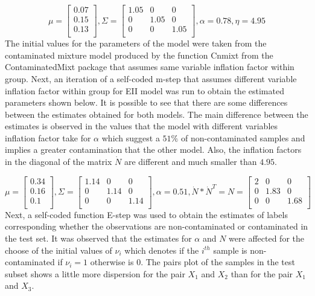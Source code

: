 \documentclass[
]{article}
\begin{document}
\[
\mu = \begin{bmatrix}0.07 \\0.15 \\0.13 \\\end{bmatrix} , \Sigma = \begin{bmatrix}1.05&0&0 \\0&1.05&0 \\0&0&1.05 \\\end{bmatrix}, \alpha = 0.78 , \eta = 4.95
\] The initial values for the parameters of the model were taken from
the contaminated mixture model produced by the function Cnmixt from the
ContaminatedMixt package that assumes same variable inflation factor
within group. Next, an iteration of a self-coded m-step that assumes
different variable inflation factor within group for EII model was run
to obtain the estimated parameters shown below. It is possible to see
that there are some differences between the estimates obtained for both
models. The main difference between the estimates is observed in the
values that the model with different variables inflation factor take for
\(\alpha\) which suggest a \(51\%\) of non-contaminated samples and
implies a greater contamination that the other model. Also, the
inflation factors in the diagonal of the matrix \(\dot{N}\) are
different and much smaller than \(4.95\).

\[
\mu = \begin{bmatrix}0.34 \\0.16 \\0.1 \\\end{bmatrix} , \Sigma = \begin{bmatrix}1.14&0&0 \\0&1.14&0 \\0&0&1.14 \\\end{bmatrix} , \alpha = 0.51, \dot{N} * \dot{N}^{T} = N = \begin{bmatrix}2&0&0 \\0&1.83&0 \\0&0&1.68 \\\end{bmatrix}
\] Next, a self-coded function E-step was used to obtain the estimates
of labels corresponding whether the observations are non-contaminated or
contaminated in the test set. It was observed that the estimates for
\(\alpha\) and \(N\) were affected for the choose of the initial values
of \(\nu_{i}\) which denotes if the \(i^{th}\) sample is
non-contaminated if \(\nu_{i}=1\) otherwise is \(0\). The pairs plot of
the samples in the test subset shows a little more dispersion for the
pair \(X_{1}\) and \(X_{2}\) than for the pair \(X_{1}\) and \(X_{3}\).
\end{document}
